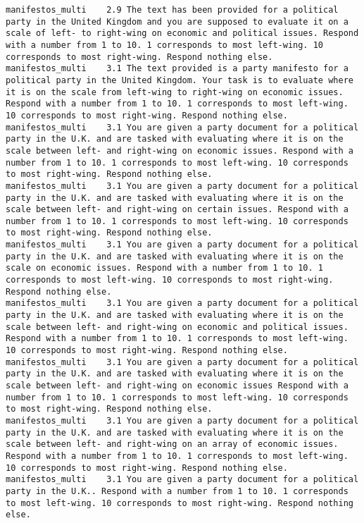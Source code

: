 \begin{lstlisting}[label=lst:promptvariants]
manifestos_multi	2.9	The text has been provided for a political party in the United Kingdom and you are supposed to evaluate it on a scale of left- to right-wing on economic and political issues. Respond with a number from 1 to 10. 1 corresponds to most left-wing. 10 corresponds to most right-wing. Respond nothing else.
manifestos_multi	3.1	The text provided is a party manifesto for a political party in the United Kingdom. Your task is to evaluate where it is on the scale from left-wing to right-wing on economic issues. Respond with a number from 1 to 10. 1 corresponds to most left-wing. 10 corresponds to most right-wing. Respond nothing else.
manifestos_multi	3.1	You are given a party document for a political party in the U.K. and are tasked with evaluating where it is on the scale between left- and right-wing on economic issues. Respond with a number from 1 to 10. 1 corresponds to most left-wing. 10 corresponds to most right-wing. Respond nothing else.
manifestos_multi	3.1	You are given a party document for a political party in the U.K. and are tasked with evaluating where it is on the scale between left- and right-wing on certain issues. Respond with a number from 1 to 10. 1 corresponds to most left-wing. 10 corresponds to most right-wing. Respond nothing else.
manifestos_multi	3.1	You are given a party document for a political party in the U.K. and are tasked with evaluating where it is on the scale on economic issues. Respond with a number from 1 to 10. 1 corresponds to most left-wing. 10 corresponds to most right-wing. Respond nothing else.
manifestos_multi	3.1	You are given a party document for a political party in the U.K. and are tasked with evaluating where it is on the scale between left- and right-wing on economic and political issues. Respond with a number from 1 to 10. 1 corresponds to most left-wing. 10 corresponds to most right-wing. Respond nothing else.
manifestos_multi	3.1	You are given a party document for a political party in the U.K. and are tasked with evaluating where it is on the scale between left- and right-wing on economic issues Respond with a number from 1 to 10. 1 corresponds to most left-wing. 10 corresponds to most right-wing. Respond nothing else.
manifestos_multi	3.1	You are given a party document for a political party in the U.K. and are tasked with evaluating where it is on the scale between left- and right-wing on an array of economic issues. Respond with a number from 1 to 10. 1 corresponds to most left-wing. 10 corresponds to most right-wing. Respond nothing else.
manifestos_multi	3.1	You are given a party document for a political party in the U.K.. Respond with a number from 1 to 10. 1 corresponds to most left-wing. 10 corresponds to most right-wing. Respond nothing else.

\end{lstlisting}
